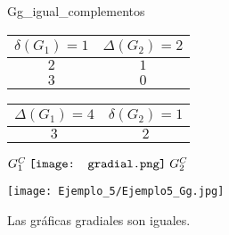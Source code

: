 \documentclass[fleqn, 11pt]{beamer}
\newcommand{\gradial}{\hspace{0.9mm} \texttt{[image: gradial.png]} \hspace{1mm}}
\begin{document}
\begin{ejemplo}[breakable, pad at break = 4mm, beforeafter skip = 4mm]{}{Gg_igual_complementos}
\begin{center}
\begin{minipage}[h]{0.6\linewidth}
                \begin{minipage}[h]{0.45\linewidth}
                    \begin{tcolorbox}[title empty, colframe = black!99!white, colback = white, sharp corners, hbox, nobeforeafter, left = -0.9mm, right = -0.9mm, top = -0.9mm, bottom = -0.9mm]
                        \begin{tabular}{c|c}
                            \rowcolor{gray!36!white} 
                            $ \delta(G_1) = 1 $ & $ \Delta(G_2) = 2 $ \\ \hline \hline
                            $ 2 $               & $ 1 $ \\ \hline
                            $ 3 $               & $ 0 $
                        \end{tabular}
                    \end{tcolorbox}
                \end{minipage}
                \begin{minipage}[h]{0.45\linewidth}
                    \begin{tcolorbox}[title empty, colframe = black!99!white, colback = white, sharp corners, hbox, nobeforeafter, left = -0.9mm, right = -0.9mm, top = -0.9mm, bottom = -0.9mm]
                        \begin{tabular}{c|c}
                            \rowcolor{gray!36!white} 
                            $ \Delta(G_1) = 4 $ & $ \delta(G_2) = 1 $ \\ \hline \hline
                            $ 3 $               & $ 2 $
                        \end{tabular}
                    \end{tcolorbox}
                \end{minipage}
            \end{minipage}
            \begin{minipage}[h]{0.25\linewidth}
                \centering
                
                $ G_1^C \gradial G_2^C $

                \texttt{[image: Ejemplo\_5/Ejemplo5\_Gg.jpg]}
            \end{minipage}
        \end{center} \vspace{3mm}

        Las gráficas gradiales son iguales.
    \end{ejemplo}
\end{document}
